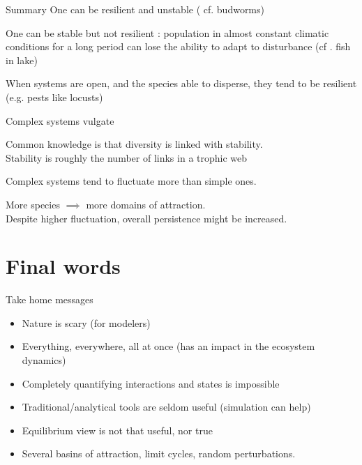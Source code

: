 \documentclass[11,aspectratio=1610]{beamer}
\begin{document}
\begin{frame}{Summary}
\vfill
One can be resilient \alert{and} unstable ( cf. budworms)
\vfill

One can be stable but not resilient :  population in almost constant climatic  conditions for a long period can lose the ability to adapt to disturbance (cf . fish in lake) 

\vfill
When systems are \alert{open}, and the species able to \alert{disperse}, they tend to be resilient  (e.g. pests like locusts)

\vfill

\end{frame}
\begin{frame}{Complex systems vulgate}


 Common knowledge is that diversity is linked with stability. \\

 Stability is roughly the number of links in a trophic web 

\vfill

 
 Complex systems tend to fluctuate more than simple ones.

\vfill

 More species $\implies$ more domains of attraction. \\

 Despite higher fluctuation, overall persistence might be increased. 
 



\end{frame}


\section{Final words}

\begin{frame}{Take home messages}

\begin{itemize}
 \item Nature is scary (for modelers)
 \item Everything, everywhere, all at once  (has an impact in the ecosystem dynamics)
 \item Completely quantifying interactions and states  is impossible 
 \item Traditional/analytical tools are seldom useful (simulation can help)
 \item Equilibrium view is not that useful, nor true
 \item Several basins of attraction, limit cycles, random perturbations.
\end{itemize}

\end{frame}
\end{document}
